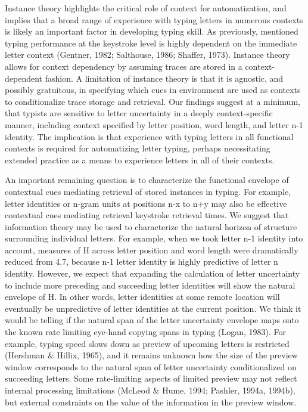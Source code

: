 \documentclass[,man,floatsintext]{apa6}
\begin{document}
Instance theory highlights the critical role of context for automatization, and implies that a broad range of experience with typing letters in numerous contexts is likely an important factor in developing typing skill. As previously, mentioned typing performance at the keystroke level is highly dependent on the immediate letter context (Gentner, 1982; Salthouse, 1986; Shaffer, 1973). Instance theory allows for context dependency by assuming traces are stored in a context-dependent fashion. A limitation of instance theory is that it is agnostic, and possibly gratuitous, in specifying which cues in environment are used as contexts to conditionalize trace storage and retrieval. Our findings suggest at a minimum, that typists are sensitive to letter uncertainty in a deeply context-specific manner, including context specified by letter position, word length, and letter n-1 identity. The implication is that experience with typing letters in all functional contexts is required for automatizing letter typing, perhaps necessitating extended practice as a means to experience letters in all of their contexts.

An important remaining question is to characterize the functional envelope of contextual cues mediating retrieval of stored instances in typing. For example, letter identities or n-gram units at positions n-x to n+y may also be effective contextual cues mediating retrieval keystroke retrieval times. We suggest that information theory may be used to characterize the natural horizon of structure surrounding individual letters. For example, when we took letter n-1 identity into account, measures of H across letter position and word length were dramatically reduced from 4.7, because n-1 letter identity is highly predictive of letter n identity. However, we expect that expanding the calculation of letter uncertainty to include more preceding and succeeding letter identities will show the natural envelope of H. In other words, letter identities at some remote location will eventually be unpredictive of letter identities at the current position. We think it would be telling if the natural span of the letter uncertainty envelope maps onto the known rate limiting eye-hand copying spans in typing (Logan, 1983). For example, typing speed slows down as preview of upcoming letters is restricted (Hershman \& Hillix, 1965), and it remains unknown how the size of the preview window corresponds to the natural span of letter uncertainty conditionalized on succeeding letters. Some rate-limiting aspects of limited preview may not reflect internal processing limitations (McLeod \& Hume, 1994; Pashler, 1994a, 1994b), but external constraints on the value of the information in the preview window.
\end{document}
